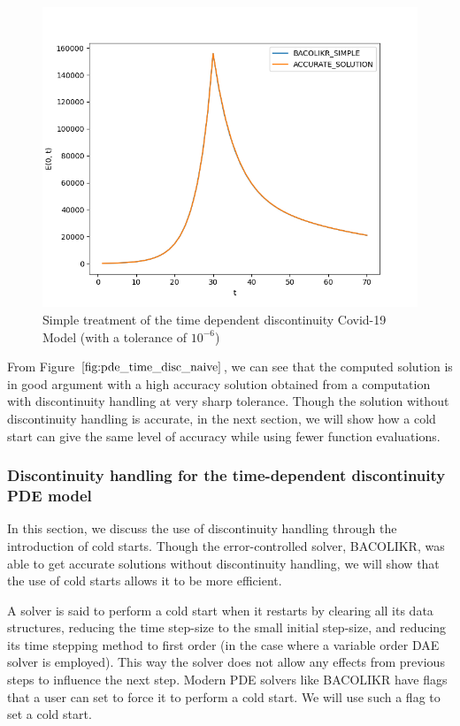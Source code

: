 \documentclass{article}
\begin{document}
\begin{figure}[H]
\centering
\includegraphics[width=0.7\linewidth]{./figures/pde_time_disc_naive}
\caption{Simple treatment of the time dependent discontinuity Covid-19 Model (with a tolerance of $10^{-6}$)}
\label{fig:pde_time_disc_naive}
\end{figure}

From Figure $\ref{fig:pde_time_disc_naive}$, we can see that the computed solution is in good argument with a high accuracy solution obtained from a computation with discontinuity handling at very sharp tolerance. Though the solution without discontinuity handling is accurate, in the next section, we will show how a cold start can give the same level of accuracy while using fewer function evaluations.

\subsubsection{Discontinuity handling for the time-dependent discontinuity PDE model}
\label{subsubsection:pde_time_disc_hand}
In this section, we discuss the use of discontinuity handling through the introduction of cold starts. Though the error-controlled solver, BACOLIKR, was able to get accurate solutions without discontinuity handling, we will show that the use of cold starts allows it to be more efficient.

A solver is said to perform a cold start when it restarts by clearing all its data structures, reducing the time step-size to the small initial step-size, and reducing its time stepping method to first order (in the case where a variable order DAE solver is employed). This way the solver does not allow any effects from previous steps to influence the next step. Modern PDE solvers like BACOLIKR have flags that a user can set to force it to perform a cold start. We will use such a flag to set a cold start.
\end{document}
